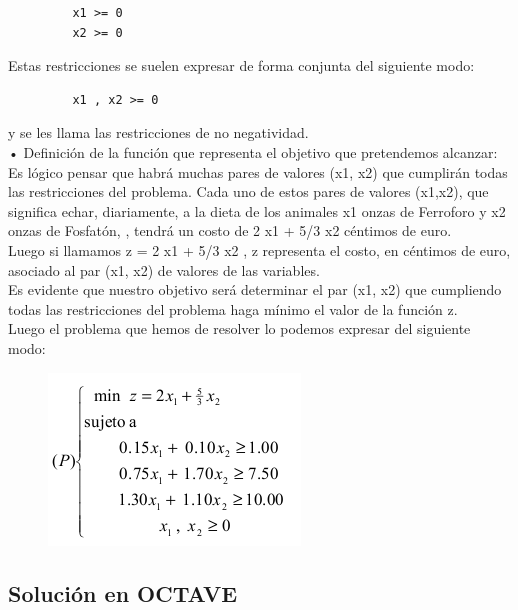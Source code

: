 \documentclass[a4,12pt]{article}
\begin{document}
\begin{verbatim}
         x1 >= 0
         x2 >= 0
\end{verbatim}

Estas restricciones se suelen expresar de forma conjunta del siguiente modo:\\
\begin{verbatim}
         x1 , x2 >= 0
\end{verbatim}

y se les llama las restricciones de no negatividad.\\

• Definición de la función que representa el objetivo que pretendemos alcanzar:\\
Es lógico pensar que habrá muchas pares de valores (x1, x2) que cumplirán todas las restricciones del problema. Cada uno de estos pares de valores (x1,x2), que significa echar, diariamente, a la dieta de los animales x1 onzas de Ferroforo y x2 onzas de Fosfatón, , tendrá un costo de 2 x1 + 5/3 x2 céntimos de euro.\\

Luego si llamamos z = 2 x1 + 5/3 x2 , z representa el costo, en céntimos de euro, asociado al par (x1, x2) de valores de las variables.\\

Es evidente que nuestro objetivo será determinar el par (x1, x2) que cumpliendo todas las restricciones del problema haga mínimo el valor de la función z.\\

Luego el problema que hemos de resolver lo podemos expresar del siguiente modo:\\
         
\begin{figure}[H]
  \centering
    \includegraphics{imagenes/SolucionDieta}
\end{figure}

\subsection{Solución en OCTAVE}
 
\end{document}
